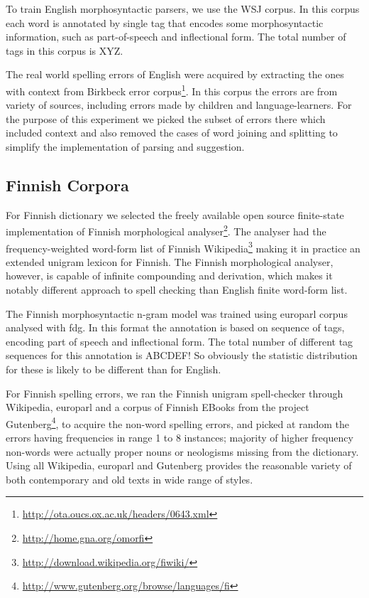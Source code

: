 \documentclass{llncs}
\begin{document}
To train English morphosyntactic parsers, we use the WSJ corpus. In
this corpus each word is annotated by single tag that encodes some
morphosyntactic information, such as part-of-speech and inflectional form. The
total number of tags in this corpus is XYZ.

The real world spelling errors of English were acquired by extracting the ones
with context from Birkbeck error
corpus\footnote{\url{http://ota.oucs.ox.ac.uk/headers/0643.xml}}. In this
corpus the errors are from variety of sources, including errors made by
children and language-learners. For the purpose of this experiment we picked
the subset of errors there which included context and also removed the cases of
word joining and splitting to simplify the implementation of parsing and
suggestion.

\subsection{Finnish Corpora}

For Finnish dictionary we selected the freely available open source
finite-state implementation of Finnish morphological
analyser\footnote{\url{http://home.gna.org/omorfi}}. The analyser had the
frequency-weighted word-form list of Finnish
Wikipedia\footnote{\url{http://download.wikipedia.org/fiwiki/}} making it in
practice an extended unigram lexicon for Finnish. The Finnish morphological
analyser, however, is capable of infinite compounding and derivation, which
makes it notably different approach to spell checking than English finite
word-form list. 

The Finnish morphosyntactic n-gram model was trained using europarl corpus
analysed with fdg. In this format the annotation is based on sequence of
tags, encoding part of speech and inflectional form. The total number of
different tag sequences for this annotation is ABCDEF! So obviously the
statistic distribution for these is likely to be different than for English.

For Finnish spelling errors, we ran the Finnish unigram spell-checker through
Wikipedia, europarl and a corpus of Finnish EBooks from the project
Gutenberg\footnote{\url{http://www.gutenberg.org/browse/languages/fi}}, to
acquire the non-word spelling errors, and picked at random the errors having
frequencies in range 1 to 8 instances; majority of higher frequency non-words
were actually proper nouns or neologisms missing from the dictionary. Using all
Wikipedia, europarl and Gutenberg provides the reasonable variety of both
contemporary and old texts in wide range of styles.
\end{document}
